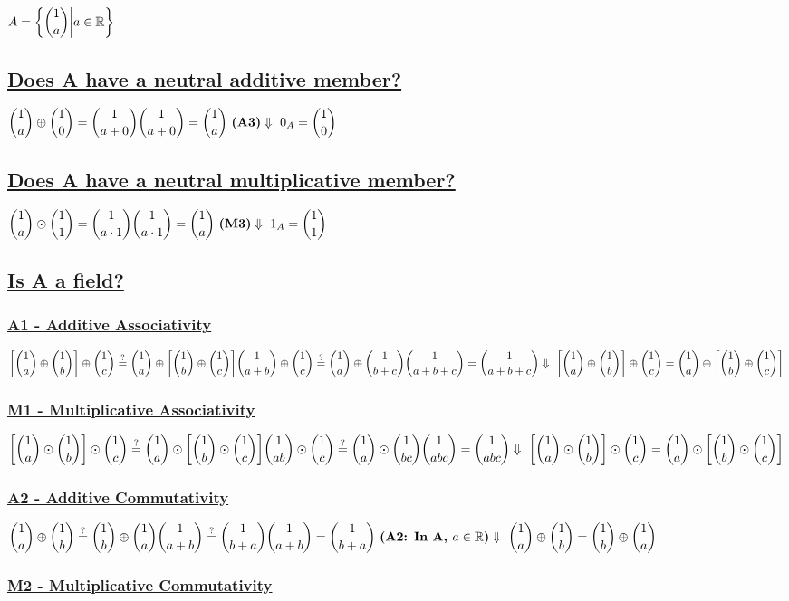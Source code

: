 \documentclass[a4paper, 12pt]{article}
\newcommand{\sub}[1]{\subsection{\underline{#1}}}
\newcommand{\subsub}[1]{\subsubsection{\underline{#1}}}
\newcommand{\?}{\stackrel{?}{=}}
\newcommand{\R}{\ensuremath{\mathbb{R}}}
\renewcommand{\b}[1]{\textbf{#1}}
\renewcommand{\because}[1]{~\b{(#1)}\\}
\renewcommand{\d}{\ensuremath{\Downarrow\\~}}
\begin{document}
\section{$ A=\bigg{\{} \dbinom{1}{a} \bigg{|} a\in{\R}\bigg{\}} $}
    \sub{Does A have a neutral additive member?}
    $
        \dbinom{1}{a} \oplus \dbinom{1}{0} = \dbinom{1}{a+0} \\
        \dbinom{1}{a+0} = \dbinom{1}{a} \because{A3}
        \d
        0_{A} = \dbinom{1}{0}
    $
    \sub{Does A have a neutral multiplicative member?}
    $
        \dbinom{1}{a} \odot \dbinom{1}{1} = \dbinom{1}{a \cdot{1}} \\
        \dbinom{1}{a \cdot{1}} = \dbinom{1}{a} \because{M3}
        \d
        1_{A} = \dbinom{1}{1}
    $
    \sub{Is A a field?}
        \subsub{A1 - Additive Associativity}
        $
            \bigg{[}\dbinom{1}{a}\oplus{}\dbinom{1}{b}\bigg{]}\oplus{}\dbinom{1}{c} \? \dbinom{1}{a} \oplus{} \bigg{[}\dbinom{1}{b}\oplus{}\dbinom{1}{c}\bigg{]} \\
            \dbinom{1}{a+b}\oplus{}\dbinom{1}{c} \? \dbinom{1}{a} \oplus{} \dbinom{1}{b+c} \\
            \dbinom{1}{a+b+c} = \dbinom{1}{a+b+c} \\
            \d
            \bigg{[}\dbinom{1}{a}\oplus{}\dbinom{1}{b}\bigg{]}\oplus{}\dbinom{1}{c} = \dbinom{1}{a} \oplus{} \bigg{[}\dbinom{1}{b}\oplus{}\dbinom{1}{c}\bigg{]}
        $
        \pagebreak
        \subsub{M1 - Multiplicative Associativity}
        $
            \bigg{[}\dbinom{1}{a}\odot{}\dbinom{1}{b}\bigg{]}\odot{}\dbinom{1}{c} \? \dbinom{1}{a} \odot{} \bigg{[}\dbinom{1}{b}\odot{}\dbinom{1}{c}\bigg{]} \\
            \dbinom{1}{ab}\odot{}\dbinom{1}{c} \? \dbinom{1}{a} \odot{} \dbinom{1}{bc} \\
            \dbinom{1}{abc} = \dbinom{1}{abc} \\
            \d
            \bigg{[}\dbinom{1}{a}\odot{}\dbinom{1}{b}\bigg{]}\odot{}\dbinom{1}{c} = \dbinom{1}{a} \odot{} \bigg{[}\dbinom{1}{b}\odot{}\dbinom{1}{c}\bigg{]}
        $
        \subsub{A2 - Additive Commutativity}
        $
            \dbinom{1}{a} \oplus \dbinom{1}{b} \? \dbinom{1}{b} \oplus \dbinom{1}{a} \\
            \dbinom{1}{a+b} \? \dbinom{1}{b+a} \\
            \dbinom{1}{a+b} = \dbinom{1}{b+a} \because{A2: In A, $a\in\R$}
            \d
            \dbinom{1}{a} \oplus \dbinom{1}{b} = \dbinom{1}{b} \oplus \dbinom{1}{a}
        $
        \subsub{M2 - Multiplicative Commutativity}
\end{document}
